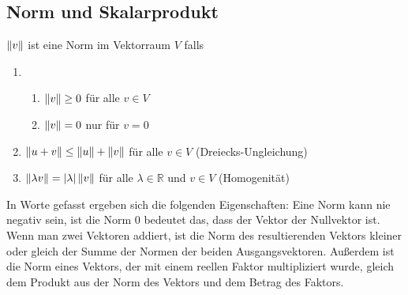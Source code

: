 


%


\subsection{Norm und Skalarprodukt}

\begin{Def}
$\left\lVert v\right\rVert$ ist eine Norm im Vektorraum $V$ falls
\begin{enumerate}
\item 
\begin{enumerate}
\item $\left\lVert v\right\rVert \geq 0$ für alle $v \in V$
\item $\left\lVert v\right\rVert = 0$ nur für $v = 0$
\end{enumerate}
\item $\left\lVert u+v\right\rVert \leq \left\lVert u\right\rVert + \left\lVert v\right\rVert$ für alle $v \in V$ (Dreiecks-Ungleichung)
\item $\left\lVert\lambda v\right\rVert = |\lambda| \left\lVert v\right\rVert$ für alle $\lambda \in \mathbb{R}$ und $v \in V$ (Homogenit\"at)
\end{enumerate}
\end{Def}

In Worte gefasst ergeben sich die folgenden Eigenschaften: Eine Norm kann nie negativ sein, ist die Norm 0 bedeutet das, dass der Vektor der Nullvektor ist. Wenn man zwei Vektoren
addiert, ist die Norm des resultierenden Vektors kleiner oder gleich der Summe der Normen der beiden Ausgangsvektoren. Außerdem ist die
Norm eines Vektors, der mit einem reellen Faktor multipliziert wurde, gleich dem Produkt aus der Norm des Vektors und dem 
Betrag des Faktors.

